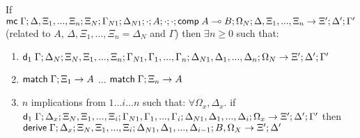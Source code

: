 \begin{lemma}
   If $\mathsf{mc} \; \Gamma; \Delta, \Xi_1, ..., \Xi_n; \Xi_N; \Gamma_{N1}; \Delta_{N1}; \cdot; A; \cdot; \cdot; \mathsf{comp} \; A \multimap B; \Omega_N; \Delta, \Xi_1, ..., \Xi_n \rightarrow \Xi'; \Delta'; \Gamma'$ (related to $A$, $\Delta, \Xi_1, ..., \Xi_n = \Delta_N$ and $\Gamma$) then $\exists n \geq 0$ such that:
   
   \begin{enumerate}
      \item $\mathsf{d}_1 \; \Gamma; \Delta_N; \Xi_N, \Xi_1, ..., \Xi_n; \Gamma_{N1}, \Gamma_1, ..., \Gamma_n; \Delta_{N1}, \Delta_1, ..., \Delta_n; \Omega_N \rightarrow \Xi'; \Delta'; \Gamma'$
      \item $\mathsf{match} \; \Gamma; \Xi_1 \rightarrow A$ ... $\mathsf{match} \; \Gamma; \Xi_n \rightarrow A$
      \item $n$ implications from $1...i...n$ such that: $\forall \Omega_x, \Delta_x.$ if $\mathsf{d}_1 \; \Gamma; \Delta_x; \Xi_N, \Xi_1, ..., \Xi_i; \Gamma_{N1}, \Gamma_1, ..., \Gamma_i; \Delta_{N1}, \Delta_1, ..., \Delta_i; \Omega_x \rightarrow \Xi'; \Delta'; \Gamma'$ then $\mathsf{derive} \; \Gamma; \Delta_x; \Xi_N, \Xi_1, ..., \Xi_i; \Delta_{N1}, \Delta_1, ..., \Delta_{i-1}; B, \Omega_X \rightarrow \Xi'; \Delta'$
   \end{enumerate}
\end{lemma}

